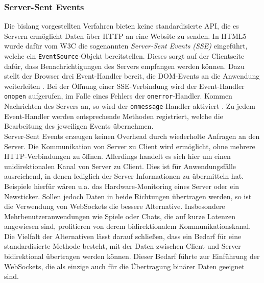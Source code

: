 \documentclass[11pt,a4paper,titlepage]{scrartcl}
\numberwithin{equation}{section}
\begin{document}
\subsubsection{Server-Sent Events}\label{subsubsec:Server-SentEvents}
Die bislang vorgestellten Verfahren bieten keine standardisierte API, die es Servern ermöglicht Daten über HTTP an eine Website zu senden. In HTML5 wurde dafür vom W3C die sogenannten \textit{Server-Sent Events (SSE)} eingeführt, welche ein \texttt{EventSource}-Objekt bereitstellen. Dieses sorgt auf der Clientseite dafür, dass Benachrichtigungen des Servers empfangen werden können. Dazu stellt der Browser drei Event-Handler bereit, die DOM-Events an die Anwendung weiterleiten \autocite[31]{gorski_websockets_2015}. Bei der Öffnung einer SSE-Verbindung wird der Event-Handler \texttt{onopen} aufgerufen, im Falle eines Fehlers der \texttt{onerror}-Handler. Kommen Nachrichten des Servers an, so wird der \texttt{onmessage}-Handler aktiviert \autocite{hickson_server-sent_2009}. Zu jedem Event-Handler werden entsprechende Methoden registriert, welche die Bearbeitung des jeweiligen Events übernehmen.\\

\noindent Server-Sent Events erzeugen keinen Overhead durch wiederholte Anfragen an den Server. Die Kommunikation von Server zu Client wird ermöglicht, ohne mehrere HTTP-Verbindungen zu öffnen. Allerdings handelt es sich hier um einen unidirektionalen Kanal von Server zu Client. Dies ist für Anwendungsfälle ausreichend, in denen lediglich der Server Informationen zu übermitteln hat. Beispiele hierfür wären u.a. das Hardware-Monitoring eines Server oder ein Newsticker. Sollen jedoch Daten in beide Richtungen übertragen werden, so ist die Verwendung von WebSockets die bessere Alternative. Insbesondere Mehrbenutzeranwendungen wie Spiele oder Chats, die auf kurze Latenzen angewiesen sind, profitieren von derem bidirektionalem Kommunikationskanal. \\

\noindent Die Vielfalt der Alternativen lässt darauf schließen, dass ein Bedarf für eine standardisierte Methode besteht, mit der Daten zwischen Client und Server bidirektional übertragen werden können. Dieser Bedarf führte zur Einführung der WebSockets, die als einzige auch für die Übertragung binärer Daten geeignet sind.
\newpage
\end{document}
